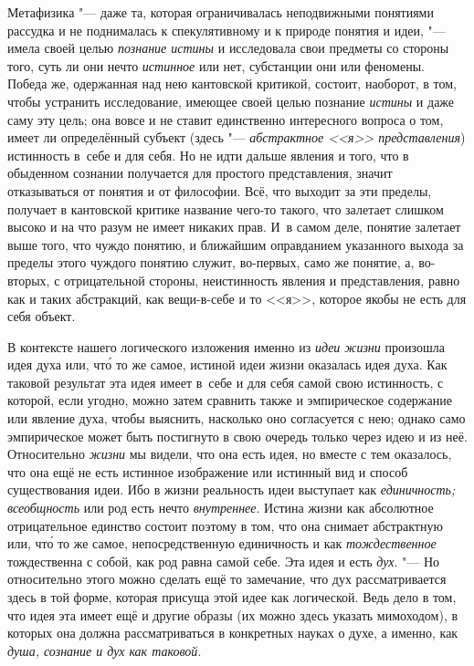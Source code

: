 Метафизика "--- даже та, которая ограничивалась
неподвижными понятиями рассудка и не поднималась к спекулятивному и к
природе понятия и идеи, "--- имела своей целью {\em познание истины} и
исследовала свои предметы со стороны того, суть ли они нечто
{\em истинное} или нет,
субстанции они или феномены. Победа же, одержанная над нею кантовской
критикой, состоит, наоборот, в том, чтобы устранить исследование, имеющее
своей целью познание {\em истины}
и даже саму эту цель; она вовсе и не ставит единственно
интересного вопроса о том, имеет ли определённый субъект (здесь
"--- {\em абстрактное <<я>> представления})
истинность в~себе и для себя. Но не идти дальше явления и
того, что в обыденном сознании получается для простого представления,
значит отказываться от понятия и от философии. Всё, что выходит за эти
пределы, получает в кантовской критике название чего-то такого, что
залетает слишком высоко и на что разум не имеет никаких прав. И~в самом
деле, понятие залетает выше того, что чуждо понятию, и ближайшим
оправданием указанного выхода за пределы этого чуждого понятию служит,
во-первых, само же понятие, а, во-вторых, с отрицательной
стороны, неистинность явления и представления, равно как и таких
абстракций, как вещи-в-себе и то <<я>>, которое якобы не есть для себя
объект.

В контексте нашего логического изложения именно из {\em идеи жизни}
произошла идея духа или, чт\'{о} то же самое, истиной идеи жизни
оказалась идея духа. Как таковой результат эта идея имеет в~себе и для себя
самой свою истинность, с которой, если угодно, можно затем сравнить также и
эмпирическое содержание или явление духа, чтобы выяснить, насколько оно
согласуется с нею; однако само эмпирическое может быть постигнуто в свою
очередь только через идею и из неё. Относительно {\em жизни} мы видели,
что она есть идея, но вместе с тем оказалось, что она ещё не есть истинное
изображение или истинный вид и способ существования идеи. Ибо в жизни
реальность идеи выступает как {\em единичность;} {\em всеобщность} или род
есть нечто {\em внутреннее}.
Истина жизни как абсолютное отрицательное единство состоит
поэтому в том, что она снимает абстрактную или, чт\'{о} то же самое,
непосредственную единичность и как {\em тождественное}
тождественна с собой, как род равна самой себе. Эта идея и
есть {\em дух}. "--- Но
относительно этого можно сделать ещё то замечание, что дух рассматривается
здесь в той форме, которая присуща этой идее как логической. Ведь дело в
том, что идея эта имеет ещё и другие образы (их можно здесь указать
мимоходом), в которых она должна рассматриваться в конкретных науках о
духе, а именно, как {\em душа, сознание и дух как таковой}.

